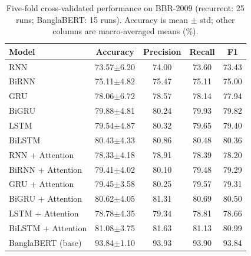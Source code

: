 \documentclass[journal]{IEEEtran}
\newcommand{\pmstd}[2]{#1$\pm$#2}
\begin{document}
\begin{table}[t]
\centering
\caption{Five-fold cross-validated performance on BBR-2009 (recurrent: 25 runs; BanglaBERT: 15 runs). Accuracy is mean $\pm$ std; other columns are macro-averaged means (\%).}
\label{tab:rnn}
\small
\begin{tabular}{lcccc}
\toprule
Model & Accuracy & Precision & Recall & F1 \\
\midrule
RNN & \pmstd{73.57}{6.20} & 74.00 & 73.60 & 73.43 \\
BiRNN & \pmstd{75.11}{4.82} & 75.47 & 75.11 & 75.00 \\
GRU & \pmstd{78.06}{6.72} & 78.57 & 78.14 & 77.94 \\
BiGRU & \pmstd{79.88}{4.81} & 80.24 & 79.93 & 79.82 \\
LSTM & \pmstd{79.54}{4.87} & 80.32 & 79.65 & 79.40 \\
BiLSTM & \pmstd{80.43}{4.33} & 80.86 & 80.48 & 80.36 \\
RNN + Attention & \pmstd{78.33}{4.18} & 78.91 & 78.39 & 78.20 \\
BiRNN + Attention & \pmstd{79.41}{4.02} & 80.10 & 79.48 & 79.29 \\
GRU + Attention & \pmstd{79.45}{3.58} & 80.25 & 79.57 & 79.31 \\
BiGRU + Attention & \pmstd{80.62}{4.05} & 81.31 & 80.69 & 80.50 \\
LSTM + Attention & \pmstd{78.78}{4.35} & 79.34 & 78.81 & 78.66 \\
BiLSTM + Attention & \pmstd{81.08}{3.75} & 81.63 & 81.13 & 80.99 \\
\midrule
BanglaBERT (base) & \pmstd{93.84}{1.10} & 93.93 & 93.90 & 93.84 \\
\bottomrule
\end{tabular}
\end{table}
\end{document}
